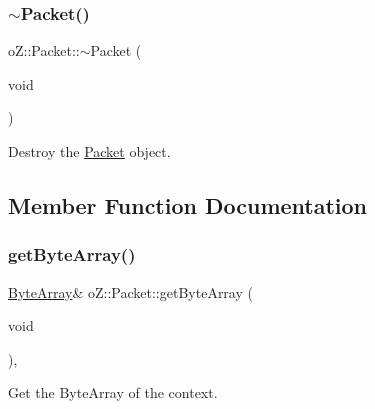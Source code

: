 \mbox{\label{classo_z_1_1_packet_a01d80a0c452b1e07dfd160f494be2af5}} 
\subsubsection{\texorpdfstring{$\sim$Packet()}{~Packet()}}
{\footnotesize\ttfamily o\+Z\+::\+Packet\+::$\sim$\+Packet (\begin{DoxyParamCaption}\item[{void}]{ }\end{DoxyParamCaption})\hspace{0.3cm}{\ttfamily [default]}}



Destroy the \mbox{\hyperlink{classo_z_1_1_packet}{Packet}} object. 



\subsection{Member Function Documentation}
\mbox{\label{classo_z_1_1_packet_a8a5d791e4675a3f065928884b64fe7bf}} 
\subsubsection{\texorpdfstring{getByteArray()}{getByteArray()}\hspace{0.1cm}{\footnotesize\ttfamily [1/2]}}
{\footnotesize\ttfamily \mbox{\hyperlink{namespaceo_z_abfa3f5a46e5c7584615dc1dd33fcafb6}{Byte\+Array}}\& o\+Z\+::\+Packet\+::get\+Byte\+Array (\begin{DoxyParamCaption}\item[{void}]{ }\end{DoxyParamCaption})\hspace{0.3cm}{\ttfamily [inline]}, {\ttfamily [noexcept]}}



Get the Byte\+Array of the context. 

\mbox{\label{classo_z_1_1_packet_a4919e1356309ad8c9d7595052d0ca498}} 
